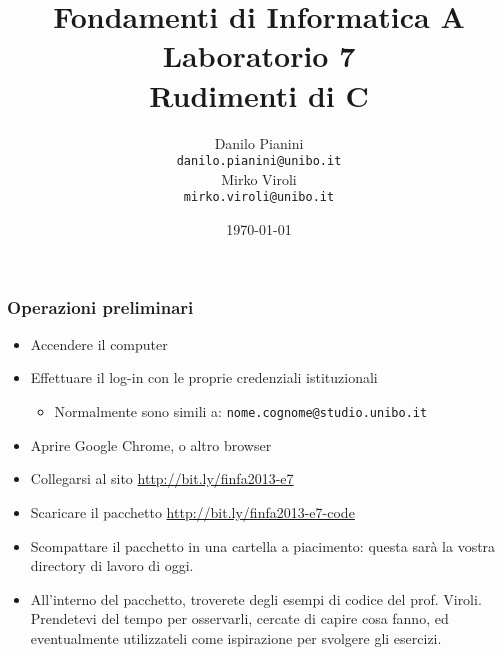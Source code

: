 \documentclass{beamer}
\begin{document}
\title[Lab1 - FV]{Fondamenti di Informatica A \\ Laboratorio 7 \\ Rudimenti di C}
\author[Danilo Pianini]{Danilo Pianini\\\texttt{danilo.pianini@unibo.it} \\ \vspace{3pt} Mirko Viroli\\\texttt{mirko.viroli@unibo.it} }
\date[\today]{\today}

\frame{\titlepage} 

\begin{frame}
\frametitle{Operazioni preliminari}
\begin{itemize}
 \item Accendere il computer
 \item Effettuare il log-in con le proprie credenziali istituzionali
  \begin{itemize}
    \item Normalmente sono simili a: \texttt{nome.cognome@studio.unibo.it}
  \end{itemize}
 \item Aprire Google Chrome, o altro browser
 \item Collegarsi al sito \url{http://bit.ly/finfa2013-e7}
 \item Scaricare il pacchetto \url{http://bit.ly/finfa2013-e7-code}
 \item Scompattare il pacchetto in una cartella a piacimento: questa sarà la vostra directory di lavoro di oggi.
 \item All'interno del pacchetto, troverete degli esempi di codice del prof. Viroli. Prendetevi del tempo per osservarli, cercate di capire cosa fanno, ed eventualmente utilizzateli come ispirazione per svolgere gli esercizi.
\end{itemize}
\end{frame}
\end{document}
